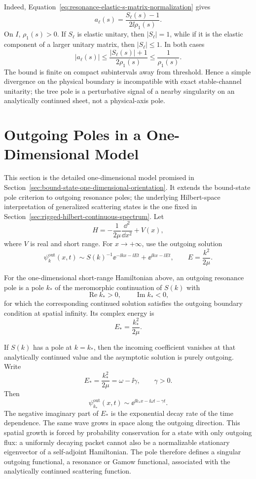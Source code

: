 Indeed,
Equation~\eqref{eq:resonance-elastic-s-matrix-normalization} gives
\[
  a_\ell(s)=\frac{S_\ell(s)-1}{2\ii\rho_1(s)} .
\]
On \(I\), \(\rho_1(s)>0\).  If \(S_\ell\) is elastic unitary, then
\(|S_\ell|=1\), while if it is the elastic component of a larger unitary
matrix, then \(|S_\ell|\le1\).  In both cases
\[
  |a_\ell(s)|
  \le
  \frac{|S_\ell(s)|+1}{2\rho_1(s)}
  \le
  \frac{1}{\rho_1(s)} .
\]
The bound is finite on compact subintervals away from threshold.  Hence a
simple divergence on the physical boundary is incompatible with exact
stable-channel unitarity; the tree pole is a perturbative signal of a nearby
singularity on an analytically continued sheet, not a physical-axis pole.

\section{Outgoing Poles in a One-Dimensional Model}
\label{sec:resonance-one-dimensional-outgoing-poles}

This section is the detailed one-dimensional model promised in
Section~\ref{sec:bound-state-one-dimensional-orientation}.  It extends the
bound-state pole criterion to outgoing resonance poles; the underlying
Hilbert-space interpretation of generalized scattering states is the one fixed
in Section~\ref{sec:rigged-hilbert-continuous-spectrum}.  Let
\[
  H=-\frac{1}{2\mu}\frac{\dd^2}{\dd x^2}+V(x),
\]
where \(V\) is real and short range. For \(x\to+\infty\), use the outgoing
solution
\[
  \psi_k^{\mathrm{out}}(x,t)
  \sim
  S(k)^{-1}\ee^{-\ii kx-\ii Et}
  +
  \ee^{\ii kx-\ii Et},
  \qquad
  E=\frac{k^2}{2\mu}.
\]

\begin{definition}
\label{def:outgoing-one-dimensional-resonance-pole}
For the one-dimensional short-range Hamiltonian above, an outgoing resonance
pole is a pole \(k_\ast\) of the meromorphic continuation of \(S(k)\) with
\[
  \operatorname{Re}k_\ast>0,
  \qquad
  \operatorname{Im}k_\ast<0,
\]
for which the corresponding continued solution satisfies the outgoing
boundary condition at spatial infinity.  Its complex energy is
\[
  E_\ast=\frac{k_\ast^2}{2\mu}.
\]
\end{definition}

If \(S(k)\) has a pole at \(k=k_\ast\), then the incoming coefficient
vanishes at that analytically continued value and the asymptotic solution is
purely outgoing. Write
\[
  E_\ast=\frac{k_\ast^2}{2\mu}=\omega-\ii\gamma,
  \qquad
  \gamma>0.
\]
Then
\[
  \psi_{k_\ast}^{\mathrm{out}}(x,t)
  \sim
  \ee^{\ii k_\ast x-\ii\omega t-\gamma t}.
\]
The negative imaginary part of \(E_\ast\) is the exponential decay rate of
the time dependence. The same wave grows in space along the outgoing
direction. This spatial growth is forced by probability conservation for a
state with only outgoing flux: a uniformly decaying packet cannot also be a
normalizable stationary eigenvector of a self-adjoint Hamiltonian. The pole
therefore defines a singular outgoing functional, a resonance or Gamow
functional, associated with the analytically continued scattering function.

